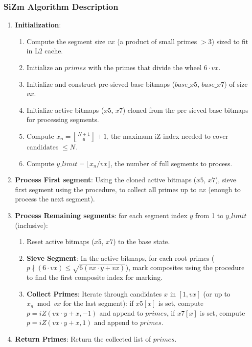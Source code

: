 \documentclass{article}
\begin{document}
\subsubsection*{SiZm Algorithm Description}
\begin{enumerate}[noitemsep]
    \item \textbf{Initialization}:
    \begin{enumerate}
        \item Compute the segment size $vx$ (a product of small primes $>3$) sized to fit in L2 cache.
        \item Initialize an  $primes$ with the primes that divide the wheel $6 \cdot vx$.
        \item Initialize and construct pre-sieved base bitmaps ($base\_x5$, $base\_x7$) of size $vx$.
        \item Initialize active bitmaps ($x5$, $x7$) cloned from the pre-sieved base bitmaps for processing segments.
        \item Compute $x_n = \left\lfloor\tfrac{N+1}{6}\right\rfloor + 1$, the maximum iZ index needed to cover candidates $\le N$.
        \item Compute $y\_limit = \lfloor x_n / vx \rfloor$, the number of full segments to process.
    \end{enumerate}
    \item \textbf{Process First segment}: 
    Using the cloned active bitmaps ($x5$, $x7$), sieve first segment using the  procedure, to collect all primes up to $vx$ (enough to process the next segment).
    \item \textbf{Process Remaining segments}: for each segment index $y$ from 1 to $y\_limit$ (inclusive):
    \begin{enumerate}
        \item Reset active bitmaps ($x5$, $x7$) to the base state.
        \item \textbf{Sieve Segment}: In the active bitmaps, for each root primes ($p \nmid (6 \cdot vx) \le \sqrt{6(vx \cdot y + vx)}$), mark composites using the  procedure to find the first composite index for marking.
        \item \textbf{Collect Primes}: Iterate through candidates $x$ in $[1, vx]$ (or up to $x_n \bmod vx$ for the last segment):
        \subitem if $x5[x]$ is set, compute $p= iZ(vx \cdot y + x, -1)$ and append to $primes$,
        \subitem if $x7[x]$ is set, compute $p= iZ(vx \cdot y + x, 1)$ and append to $primes$.
    \end{enumerate}
    \item \textbf{Return Primes}: Return the collected list of $primes$.
\end{enumerate}
\end{document}
